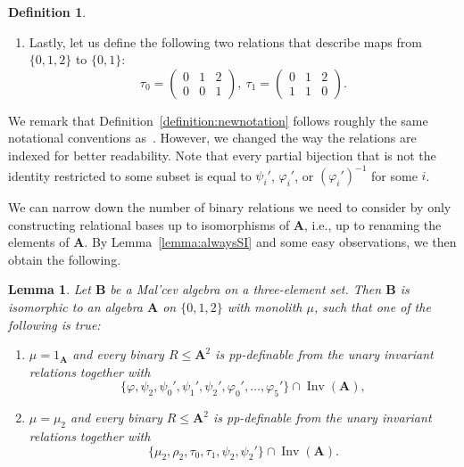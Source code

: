 \documentclass[12pt]{amsart}
\newtheorem{lemma}[theorem]{Lemma}
\theoremstyle{definition}
\theoremstyle{definition}
\newtheorem{definition}[theorem]{Definition}
\newcommand{\alg}[1]{\mathbf{#1}}
\newcommand{\algA}{\alg{A}}
\DeclareMathOperator{\Inv}{Inv}
\begin{document}
\begin{definition}
\begin{enumerate}
$$\begin{pmatrix}
    0 & 2  \\
    1 & 2 
  \end{pmatrix}.$$
\item Lastly, let us define the following two relations that describe maps from $\{0,1,2\}$ to $\{0,1\}$:
$$\tau_0 = \begin{pmatrix}
    0 & 1 & 2 \\
    0 & 0 & 1
  \end{pmatrix},\ \tau_1 = \begin{pmatrix}
    0 & 1 & 2 \\
    1 & 1 & 0
  \end{pmatrix}.$$
\end{enumerate}
\end{definition}

We remark that Definition~\ref{definition:newnotation} follows roughly the same notational conventions as~\cite{BulatovImportante}. However, we changed the way the relations are indexed for better readability. Note that every partial bijection that is not the identity restricted to some subset is equal to $\psi_i'$, $\varphi_i'$, or $(\varphi_i')^{-1}$ for some $i$.

We can narrow down the number of binary relations we need to consider by only constructing relational bases up to isomorphisms of $\algA$, i.e., up to renaming the elements of $\algA$. By Lemma~\ref{lemma:alwaysSI} and some easy observations, we then obtain the following.

\begin{lemma} \label{lemma:binary}
Let $\alg{B}$ be a Mal'cev algebra on a three-element set. Then $\alg{B}$ is isomorphic to an algebra $\algA$ on $\{0,1,2\}$ with monolith $\mu$, such that one of the following is true:
\begin{enumerate}
\item $\mu = 1_{\alg{A}}$ and every binary $R\leq \algA^2$ is pp-definable from the unary invariant relations together with
$$\{\varphi, \psi_2, \psi_0', \psi_1', \psi_2', \varphi_0', \ldots, \varphi_5' \} \cap \Inv(\algA),$$
\item $\mu = \mu_2$ and every binary $R\leq \algA^2$ is pp-definable from the unary invariant relations together with
$$\{\mu_2, \rho_2, \tau_0,\tau_1, \psi_2, \psi_2' \}\cap \Inv(\algA).$$
\end{enumerate}
\end{lemma}
\end{document}
